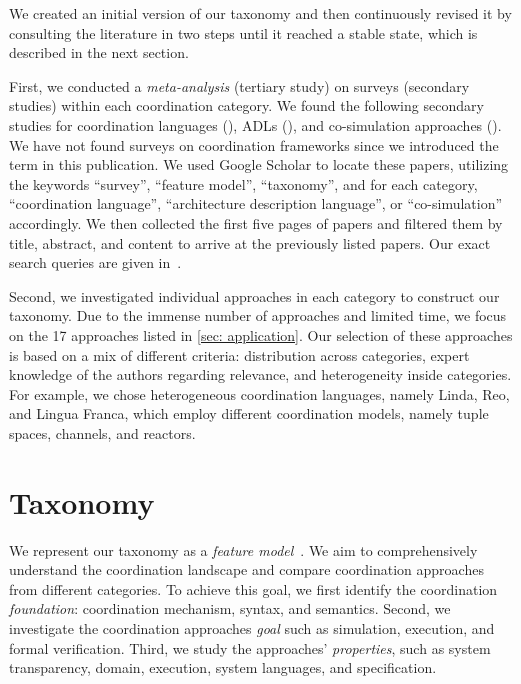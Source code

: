 \documentclass[runningheads]{llncs}
\newcommand{\quotes}[1]{``#1''}
\begin{document}
We created an initial version of our taxonomy and then continuously revised it by consulting the literature in two steps until it reached a stable state, which is described in the next section.

First, we conducted a \textit{meta-analysis} (tertiary study) on surveys (secondary studies) within each coordination category.
We found the following  secondary studies for coordination languages (\cite{papadopoulosCoordinationModelsLanguages1998,goosCoordinationModelsLanguages2001,rossiTuplebasedTechnologiesCoordination2001}), ADLs (\cite{clementsSurveyArchitectureDescription1996,medvidovicClassificationComparisonFramework2000,hussainInvestigatingArchitectureDescription2013,ozkayaAreWeThere2013,malavoltaWhatIndustryNeeds2013}), and co-simulation approaches (\cite{gomesCoSimulationSurvey2019,schweigerEmpiricalSurveyCosimulation2019,hafnerOverviewStateArt2021}).
We have not found surveys on coordination frameworks since we introduced the term in this publication.
We used Google Scholar to locate these papers, utilizing the keywords \quotes{survey}, \quotes{feature model}, \quotes{taxonomy}, and for each category, \quotes{coordination language}, \quotes{architecture description language}, or \quotes{co-simulation} accordingly.
We then collected the first five pages of papers and filtered them by title, abstract, and content to arrive at the previously listed papers.
Our exact search queries are given in~\cite{krauterCoordination2024Artifacts2024}.

Second, we investigated individual approaches in each category to construct our taxonomy.
Due to the immense number of approaches and limited time, we focus on the 17 approaches listed in \autoref{sec: application}.
Our selection of these approaches is based on a mix of different criteria: distribution across categories, expert knowledge of the authors regarding relevance, and heterogeneity inside categories.
For example, we chose heterogeneous coordination languages, namely Linda, Reo, and Lingua Franca, which employ different coordination models, namely tuple spaces, channels, and reactors.

\section{Taxonomy} \label{sec: taxonomy}
We represent our taxonomy as a \textit{feature model}~\cite{kangFeatureOrientedDomainAnalysis1990}.
We aim to comprehensively understand the coordination landscape and compare coordination approaches from different categories.
To achieve this goal, we first identify the coordination \textit{foundation}: coordination mechanism, syntax, and semantics.
Second, we investigate the coordination approaches \textit{goal} such as simulation, execution, and formal verification.
Third, we study the approaches' \textit{properties}, such as system transparency, domain, execution, system languages, and specification.
\end{document}
